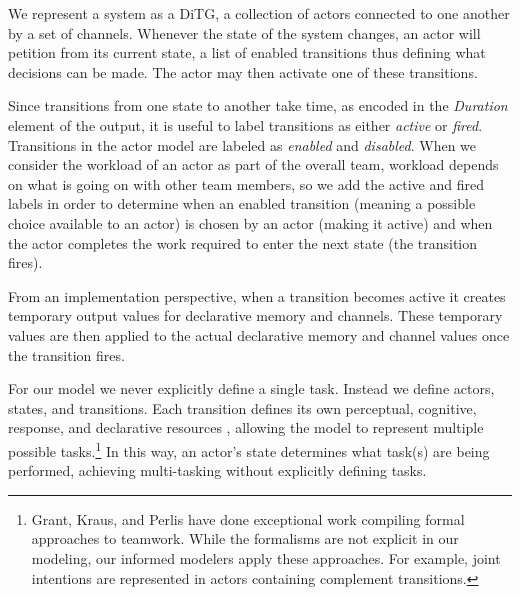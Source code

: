 \documentclass[letterpaper]{article}
\begin{document}
%



We represent a system as a DiTG, a collection of
actors connected to one another by a set of channels.  Whenever the state of the
system changes, an actor will petition from its current state, a list of enabled
transitions thus defining what decisions can be made.  The actor may then
activate one of these transitions.  

Since transitions from one state to another take time, as encoded in the {\em Duration} element of the output, it is useful to label transitions as either {\em active} or {\em fired}. Transitions in the actor model are labeled as {\em enabled} and {\em disabled}. When we consider the workload of an actor as part of the overall team, workload depends on what is going on with other team members, so we add the active and fired labels in order to determine when an enabled transition (meaning a possible choice available to an actor) is chosen by an actor (making it active) and when the actor completes the work required to enter the next state (the transition fires).  

From an implementation perspective, when a transition becomes active it creates temporary
output values for declarative memory and channels.  These temporary values are
then applied to the actual declarative memory and channel values once the transition fires.

For our model we never explicitly define a single task.  Instead
we define actors, states, and transitions.  Each transition defines its own
perceptual, cognitive, response, and declarative resources \cite{salvucci2008threaded}, allowing the model to represent multiple possible tasks.\footnote{Grant, Kraus, and Perlis have done exceptional work compiling formal approaches
to teamwork. While the formalisms are not explicit in our modeling, our informed
modelers apply these approaches. For example, joint intentions are represented
in actors containing complement transitions.}  In this way, an actor's state
determines what task(s) are being performed, achieving multi-tasking without
explicitly defining tasks. 
\end{document}
